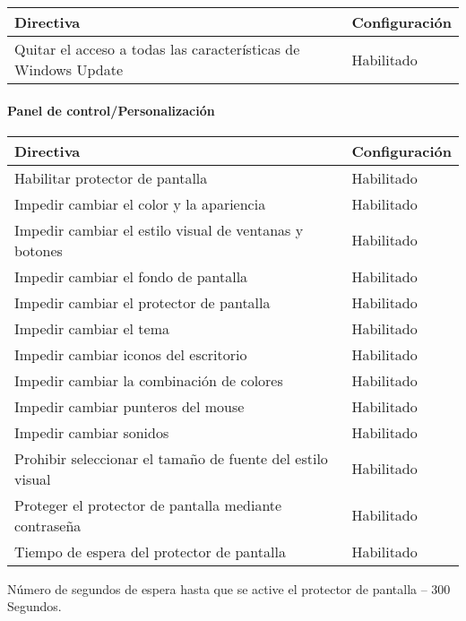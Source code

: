 \documentclass[
]{article}
\begin{document}
\begin{longtable}[]{@{}ll@{}}
\toprule
\textbf{Directiva} & \textbf{Configuración}\tabularnewline
\midrule
\endhead
Quitar el acceso a todas las características de Windows Update &
Habilitado\tabularnewline
\bottomrule
\end{longtable}

\hypertarget{panel-de-controlpersonalizaciuxf3n-2}{%
\paragraph{Panel de
control/Personalización}\label{panel-de-controlpersonalizaciuxf3n-2}}

\begin{longtable}[]{@{}ll@{}}
\toprule
\textbf{Directiva} & \textbf{Configuración}\tabularnewline
\midrule
\endhead
Habilitar protector de pantalla & Habilitado\tabularnewline
Impedir cambiar el color y la apariencia & Habilitado\tabularnewline
Impedir cambiar el estilo visual de ventanas y botones &
Habilitado\tabularnewline
Impedir cambiar el fondo de pantalla & Habilitado\tabularnewline
Impedir cambiar el protector de pantalla & Habilitado\tabularnewline
Impedir cambiar el tema & Habilitado\tabularnewline
Impedir cambiar iconos del escritorio & Habilitado\tabularnewline
Impedir cambiar la combinación de colores & Habilitado\tabularnewline
Impedir cambiar punteros del mouse & Habilitado\tabularnewline
Impedir cambiar sonidos & Habilitado\tabularnewline
Prohibir seleccionar el tamaño de fuente del estilo visual &
Habilitado\tabularnewline
Proteger el protector de pantalla mediante contraseña &
Habilitado\tabularnewline
Tiempo de espera del protector de pantalla & Habilitado\tabularnewline
\bottomrule
\end{longtable}

Número de segundos de espera hasta que se active el protector de
pantalla -- 300 Segundos.
\end{document}
